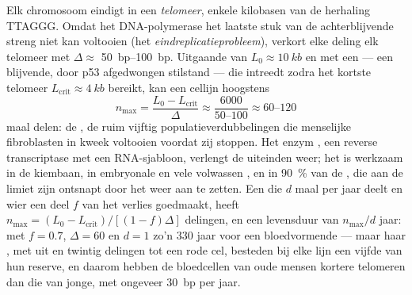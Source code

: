 \begin{theorem}\label{thm:b3:stem-cells:hayflick}
Elk chromosoom eindigt in een \emph{telomeer}, enkele kilobasen van de
herhaling TTAGGG. Omdat het DNA-polymerase het laatste stuk van de
achterblijvende streng niet kan voltooien (het
\emph{eindreplicatieprobleem}), verkort elke deling elk telomeer met
$\Delta \approx$ \qtyrange{50}{100}{bp}. Uitgaande van
$L_{0} \approx \qty{10}{kb}$ en met een \emph{}
--- een blijvende, door p53 afgedwongen stilstand --- die intreedt
zodra het kortste telomeer $L_{\text{crit}} \approx \qty{4}{kb}$
bereikt, kan een cellijn hoogstens
\[
n_{\max} = \frac{L_{0} - L_{\text{crit}}}{\Delta} \approx \frac{6000}{50\text{--}100} \approx 60\text{--}120
\]
maal delen: de \emph{}, de ruim vijftig
populatieverdubbelingen die menselijke fibroblasten in kweek voltooien
voordat zij stoppen. Het enzym \emph{}, een reverse
transcriptase met een RNA-sjabloon, verlengt de uiteinden weer; het is
werkzaam in de kiembaan, in embryonale en vele volwassen , en
in \qty{90}{\%} van de , die aan de limiet zijn ontsnapt door
het weer aan te zetten. Een  die $d$ maal per jaar deelt en wier
 een deel $f$ van het verlies goedmaakt, heeft
$n_{\max} = (L_{0} - L_{\text{crit}})/[(1 - f)\Delta]$ delingen, en een
levensduur van $n_{\max}/d$ jaar: met $f = 0.7$, $\Delta
= 60$ en $d = 1$ zo'n 330 jaar voor een bloedvormende  --- maar
haar , met  uit en twintig delingen tot een
rode cel, besteden bij elke lijn een vijfde van hun reserve, en daarom
hebben de bloedcellen van oude mensen kortere telomeren dan die van
jonge, met ongeveer \qty{30}{bp} per jaar.
\end{theorem}
